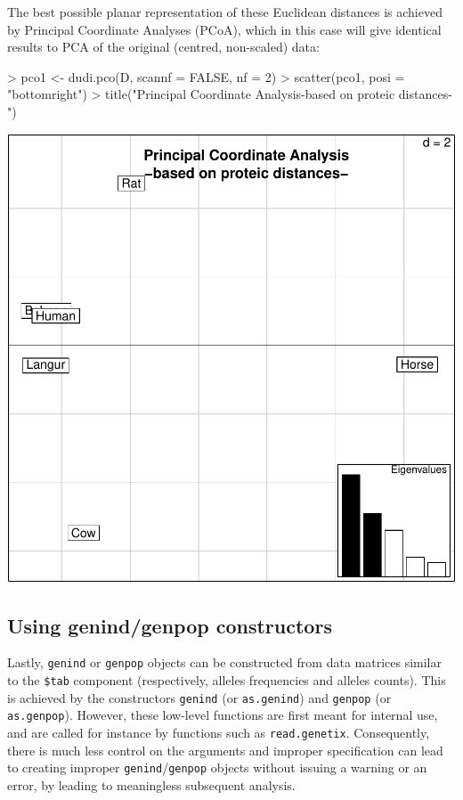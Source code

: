 \documentclass{article}
\begin{document}
The best possible planar representation of these Euclidean distances is achieved by Principal
Coordinate Analyses (PCoA), which in this case will give identical results to PCA of the original
(centred, non-scaled) data:
\begin{Schunk}
\begin{Sinput}
> pco1 <- dudi.pco(D, scannf = FALSE, nf = 2)
> scatter(pco1, posi = "bottomright")
> title("Principal Coordinate Analysis\n-based on proteic distances-")
\end{Sinput}
\end{Schunk}
\includegraphics{figs/base-040}




\subsection{Using genind/genpop constructors}
Lastly, \texttt{genind} or \texttt{genpop} objects can be constructed from data matrices similar to the \texttt{\$tab} component (respectively, alleles frequencies and alleles counts).
This is achieved by the constructors \texttt{genind} (or \texttt{as.genind})  and \texttt{genpop}
(or \texttt{as.genpop}).
However, these low-level functions are first meant for internal use, and are called for instance by
functions such as \texttt{read.genetix}.
Consequently, there is much less control on the arguments and improper specification can lead to
creating improper \texttt{genind}/\texttt{genpop} objects without issuing a warning or an error, by
leading to meaningless subsequent analysis.
\end{document}
